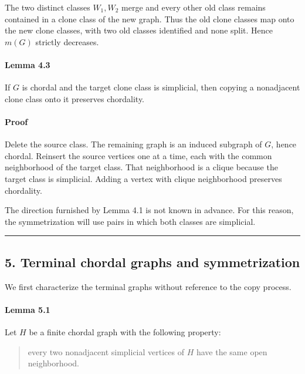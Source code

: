 \documentclass[
  american,
  11pt,
  a4paper,
]{article}
\newcounter{none} %
\begin{document}
The two distinct classes \(W_1,W_2\) merge and every other old class remains contained in a clone class of the new graph. Thus the old clone classes map onto the new clone classes, with two old classes identified and none split. Hence \(m(G)\) strictly decreases.

\paragraph{Lemma 4.3}\label{lemma-4.3}

If \(G\) is chordal and the target clone class is simplicial, then copying a nonadjacent clone class onto it preserves chordality.

\paragraph{Proof}\label{proof-4}

Delete the source class. The remaining graph is an induced subgraph of \(G\), hence chordal. Reinsert the source vertices one at a time, each with the common neighborhood of the target class. That neighborhood is a clique because the target class is simplicial. Adding a vertex with clique neighborhood preserves chordality.

The direction furnished by Lemma 4.1 is not known in advance. For this reason, the symmetrization will use pairs in which both classes are simplicial.

\begin{center}\rule{0.5\linewidth}{0.5pt}\end{center}

\subsection{5. Terminal chordal graphs and symmetrization}\label{terminal-chordal-graphs-and-symmetrization}

We first characterize the terminal graphs without reference to the copy process.

\paragraph{Lemma 5.1}\label{lemma-5.1}

Let \(H\) be a finite chordal graph with the following property:

\begin{quote}
every two nonadjacent simplicial vertices of \(H\) have the same open neighborhood.
\end{quote}
\end{document}
